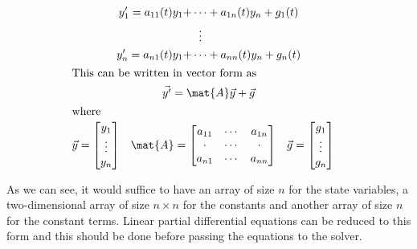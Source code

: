 \documentclass[../../main.tex]{subfiles}
\begin{document}
\begin{gather}
  \begin{aligned}
    y'_{1} = a_{11}(t)y_{1} + &\cdots + a_{1n}(t)y_{n} + g_{1}(t)   \\
                              &\vdotswithin{\cdots}                 \\
    y'_{n} = a_{n1}(t)y_{1} + &\cdots + a_{nn}(t)y_{n} + g_{n}(t)
  \end{aligned}\\
  \intertext{This can be written in vector form as}
  \begin{split}
    \vec{y'} = \mat{A}\vec{y} + \vec{g} \\
  \end{split}\\
  \shortintertext{where}
  \begin{split} \nonumber
    \begin{aligned}
      \vec{y} &=
      \begin{bmatrix}
        y_{1}  \\
        \vdots \\
        y_{n}
      \end{bmatrix}
    \end{aligned}
    \begin{aligned}
      \mat{A} &=
      \begin{bmatrix}
        a_{11} & \cdots & a_{1n} \\
        \cdot  & \cdots & \cdot  \\
        a_{n1} & \cdots & a_{nn}
      \end{bmatrix}
    \end{aligned}
    \begin{aligned}
      \vec{g} &=
      \begin{bmatrix}
        g_{1}  \\
        \vdots \\
        g_{n}
      \end{bmatrix}
    \end{aligned}
  \end{split}
\end{gather}

As we can see, it would suffice to have an array of size $n$ for the state variables,
a two-dimensional array of size $n \times n$ for the constants and another array of size $n$ for the constant terms.
Linear partial differential equations can be reduced to this form and this should be done before passing the equations to the solver.
\end{document}

